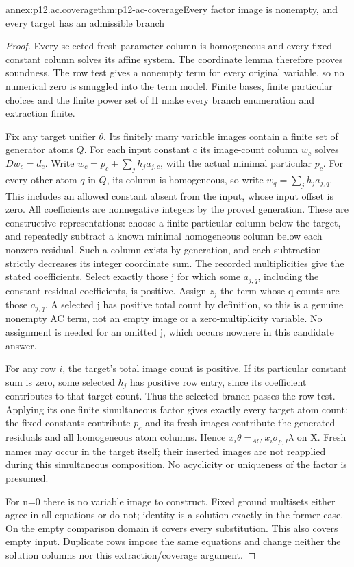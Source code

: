 \begin{annexitem}{annex:p12.ac.coverage}{thm:p12-ac-coverage}{Every factor image is nonempty, and every target has an admissible branch}
\begin{proof}
Every selected fresh-parameter column is homogeneous and every fixed
constant column solves its affine system. The coordinate lemma
therefore proves soundness. The row test gives a nonempty term for
every original variable, so no numerical zero is smuggled into the
term model. Finite bases, finite particular choices and the finite
power set of H make every branch enumeration and extraction finite.

Fix any target unifier \(\theta\). Its finitely many variable
images contain a finite set of generator atoms \(Q\). For each input
constant \(c\) its image-count column \(w_c\) solves \(Dw_c=d_c\).
Write \(w_c=p_c+\sum_j h_ja_{j,c}\), with the actual minimal
particular \(p_c\). For every other atom \(q\) in \(Q\), its column is
homogeneous, so write \(w_q=\sum_jh_ja_{j,q}\). This includes
an allowed constant absent from the input, whose input offset is zero.
All coefficients are nonnegative integers by the proved generation.
These are constructive representations: choose a finite particular
column below the target, and repeatedly subtract a known minimal
homogeneous column below each nonzero residual. Such a column exists
by generation, and each subtraction strictly decreases its integer
coordinate sum. The recorded multiplicities give the stated coefficients.
Select exactly those j for which some \(a_{j,q}\), including
the constant residual coefficients, is positive. Assign \(z_j\)
the term whose q-counts are those \(a_{j,q}\). A selected j
has positive total count by definition, so this is a genuine
nonempty AC term, not an empty image or a zero-multiplicity variable.
No assignment is needed for an omitted j, which occurs nowhere
in this candidate answer.

For any row \(i\), the target's total image count is positive. If its
particular constant sum is zero, some selected \(h_j\) has positive
row entry, since its coefficient contributes to that target count.
Thus the selected branch passes the row test. Applying its one
finite simultaneous factor gives exactly every target atom count:
the fixed constants contribute \(p_c\) and its fresh images contribute
the generated residuals and all homogeneous atom columns. Hence
\(x_i\theta=_{AC}x_i\sigma_{p,I}\lambda\) on X. Fresh
names may occur in the target itself; their inserted images are
not reapplied during this simultaneous composition. No acyclicity
or uniqueness of the factor is presumed.

For n=0 there is no variable image to construct. Fixed ground
multisets either agree in all equations or do not; identity is
a solution exactly in the former case. On the empty comparison
domain it covers every substitution. This also covers empty input.
Duplicate rows impose the same equations and change neither the
solution columns nor this extraction/coverage argument.
\end{proof}
\end{annexitem}

